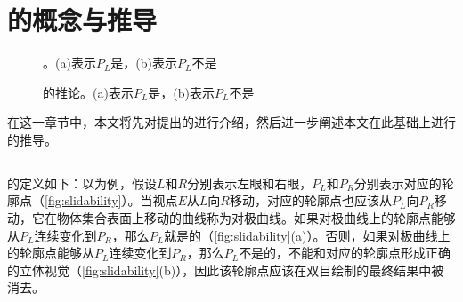 \chapter{\epsl{}的概念与推导}

\begin{figure}[tbh]
    \centering
    \hfil
    \caption{\epsl{}。(a)表示$P_L$是\epslb{}，(b)表示$P_L$不是\epslb{}} \label{fig_sim2}
    \label{fig:slidability}
\end{figure}

\begin{figure}[tbh]
    \centering
    \hfil
    \caption{\epsl{}的推论。(a)表示$P_L$是\epslb{}，(b)表示$P_L$不是\epslb{}} \label{fig:inverse_slidability}
\end{figure}

在这一章节中，本文将先对\citeauthor{kim2013stereoscopic}提出的\epsl{}\cite{kim2013stereoscopic}进行介绍，然后进一步阐述本文在此基础上进行的推导。

\section{\epsl{}}

\epsl{}的定义如下：以\con{}为例，假设$L$和$R$分别表示左眼和右眼，$P_L$和$P_R$分别表示对应的轮廓点（\autoref{fig:slidability}）。当视点$E$从$L$向$R$移动，对应的轮廓点也应该从$P_L$向$P_R$移动，它在物体集合表面上移动的曲线称为对极曲线\cite{geiger1995occlusions}。如果对极曲线上的轮廓点能够从$P_L$连续变化到$P_R$，那么$P_L$就是\epslb{}的（\autoref{fig:slidability}(a)）。否则，如果对极曲线上的轮廓点能够从$P_L$连续变化到$P_R$，那么$P_L$不是\epslb{}的，不能和对应的轮廓点形成正确的立体视觉（\autoref{fig:slidability}(b)），因此该轮廓点应该在双目绘制的最终结果中被消去。
 
